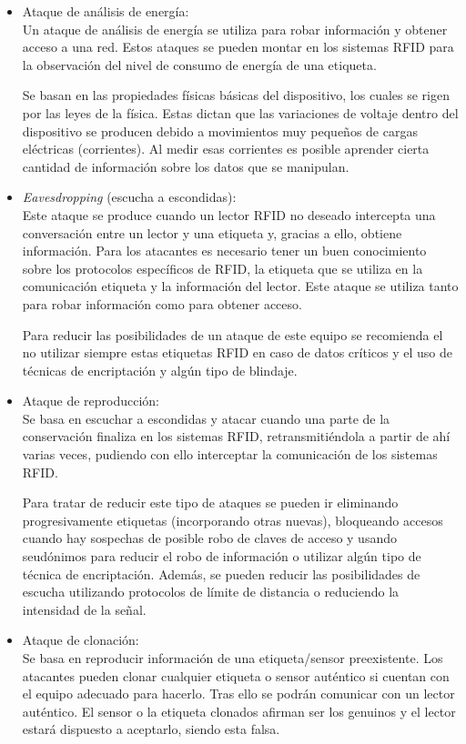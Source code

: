 \documentclass[12pt,a4paper,onecolumn,oneside]{report}
\begin{document}
\begin{itemize}

\item Ataque de análisis de energía:\\ 
Un ataque de análisis de energía se utiliza para robar información y obtener acceso a una red. Estos ataques se pueden montar en los sistemas RFID para la observación del nivel de consumo de energía de una etiqueta. 

Se basan en las propiedades físicas básicas del dispositivo, los cuales se rigen por las leyes de la física. Estas dictan que las variaciones de voltaje dentro del dispositivo se producen debido a movimientos muy pequeños de cargas eléctricas (corrientes). Al medir esas corrientes es posible aprender cierta cantidad de información sobre los datos que se manipulan.

\item \textit{Eavesdropping} (escucha a escondidas):\\
Este ataque se produce cuando un lector RFID no deseado intercepta una conversación entre un lector y una etiqueta y, gracias a ello, obtiene información. Para los atacantes es necesario tener un buen conocimiento sobre los protocolos específicos de RFID, la etiqueta que se utiliza en la comunicación etiqueta y la información del lector. Este ataque se utiliza tanto para robar información como para obtener acceso.

Para reducir las posibilidades de un ataque de este equipo se recomienda el no utilizar siempre estas etiquetas RFID en caso de datos críticos y el uso de técnicas de encriptación y algún tipo de blindaje.

\item Ataque de reproducción:\\
Se basa en escuchar a escondidas y atacar cuando una parte de la conservación finaliza en los sistemas RFID, retransmitiéndola a partir de ahí varias veces, pudiendo con ello interceptar la comunicación de los sistemas RFID. 

Para tratar de reducir este tipo de ataques se pueden ir eliminando progresivamente etiquetas (incorporando otras nuevas), bloqueando  accesos cuando hay sospechas de posible robo de claves de acceso y usando seudónimos para reducir el robo de información o utilizar algún tipo de técnica de encriptación. Además, se pueden reducir las posibilidades de escucha utilizando protocolos de límite de distancia o reduciendo la intensidad de la señal.

\item Ataque de clonación:\\
Se basa en reproducir información de una etiqueta/sensor preexistente. Los atacantes pueden clonar cualquier etiqueta o sensor auténtico si cuentan con el equipo adecuado para hacerlo. Tras ello se podrán comunicar con un lector auténtico. El sensor o la etiqueta clonados afirman ser los genuinos y el lector estará dispuesto a aceptarlo, siendo esta falsa.


\end{itemize}
\end{document}
